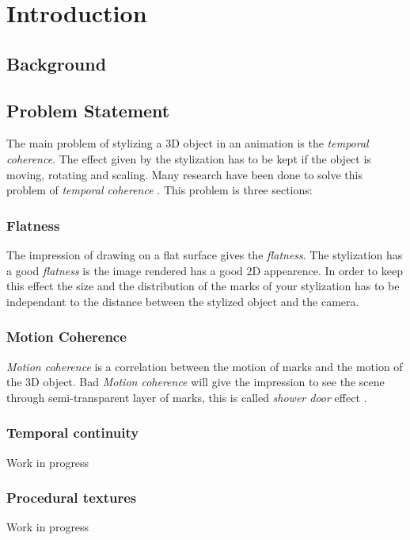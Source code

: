 \chapter{Introduction}


\section{Background}

\section{Problem Statement}

The main problem of stylizing a 3D object in an animation is the \textit{temporal coherence}. The effect given by the stylization has to be kept if the object is moving, rotating and scaling. Many research have been done to solve this problem of \textit{temporal coherence} \cite{vergne_implicit_2011, benard_dynamic_2009, bleron_motion-coherent_2018}. This problem is three sections:

\subsection{Flatness}

The impression of drawing on a flat surface gives the \textit{flatness}. The stylization has a good \textit{flatness} is the image rendered has a good 2D appearence. In order to keep this effect the size and the distribution of the marks of your stylization has to be independant to the distance between the stylized object and the camera.

\subsection{Motion Coherence}

\textit{Motion coherence} is a correlation between the motion of marks and the motion of the 3D object. Bad \textit{Motion coherence} will give the impression to see the scene through semi-transparent layer of marks, this is called \textit{shower door} effect \cite{meier_painterly_1996}.

\subsection{Temporal continuity}

Work in progress

\subsection{Procedural textures}

Work in progress
